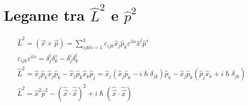 \chapter{\texorpdfstring{Legame tra \(\hat{L}^2\) e \(\hat{p}^2\)}{}}

\begin{gather*}
    \hat{L}^2 = (\vec{x}\times \vec{p}) = \sum_{ijkls = 1}^3 \varepsilon_{ijk} \hat{x}_j \hat{p}_k \varepsilon^{ils}\hat{x}^l\hat{p}^s \\
    \varepsilon_{ijk} \varepsilon^{ils} = \delta^l_j \delta^s_k - \delta^i_j \delta^l_k \tag{a}\\
    \hat{L}^2 = \hat{x}_j\hat{p}_k \hat{x}_j \hat{p}_k - \hat{x}_j \hat{p}_k \hat{x}_k \hat{p}_j = \hat{x}_j (\hat{x}_j \hat{p}_k - i\hslash \delta_{jk}) \hat{p}_k - \hat{x}_j \hat{p}_k (\hat{p}_j \hat{x}_k + i \hslash \delta_{jk}) \\
    \hat{L}^2 = \hat{x}^2 \hat{p}^2 - {(\hat{\vec{x}}\cdot \hat{\vec{x}})}^2 + i\hslash(\hat{\vec{x}}\cdot \hat{\vec{x}}) \tag{0}
\end{gather*}

